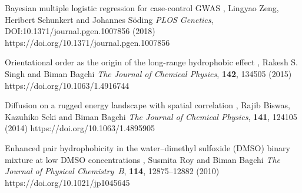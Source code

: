 


\begin{cvpubs}

%
        {Bayesian multiple logistic regression for case-control GWAS}
        {\selfauthor{}, Lingyao Zeng, Heribert Schunkert and Johannes S\"oding}
        {{\slshape PLOS Genetics}, DOI:10.1371/journal.pgen.1007856 (2018)}
        {https://doi.org/10.1371/journal.pgen.1007856}

%
        {Orientational order as the origin of the long-range hydrophobic effect}
        {\selfauthor{}, Rakesh S. Singh and Biman Bagchi}
        {{\slshape The Journal of Chemical Physics}, {\bfseries 142}, 134505 (2015)}
        {https://doi.org/10.1063/1.4916744}

%
        {Diffusion on a rugged energy landscape with spatial correlation}
        {\selfauthor{}, Rajib Biswas, Kazuhiko Seki and Biman Bagchi}
        {{\slshape The Journal of Chemical Physics}, {\bfseries 141}, 124105 (2014)}
        {https://doi.org/10.1063/1.4895905}

%
        {Enhanced pair hydrophobicity in the water--dimethyl sulfoxide (DMSO)
        binary mixture at low DMSO concentrations}
        {\selfauthor{}, Susmita Roy and Biman Bagchi}
        {{\slshape The Journal of Physical Chemistry~B}, {\bfseries 114}, 12875--12882 (2010)}
        {https://doi.org/10.1021/jp1045645}

\end{cvpubs}

